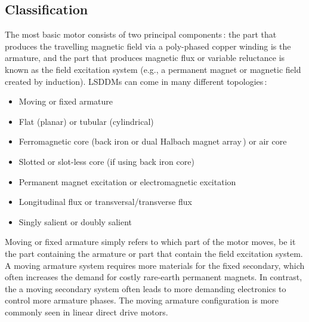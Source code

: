     
    \subsection{Classification}                     \label{Chapter:background/linear synchronous motors for NFJI/classification}
    
        
        The most basic motor consists of two principal components\,\cite{JacekF.GierasZbigniewJ.Piech2017LinearSystems}: the part that produces the travelling magnetic field via a poly-phased copper winding is the armature, and the part that produces magnetic flux or variable reluctance is known as the field excitation system (e.g., a permanent magnet or magnetic field created by induction). \acsp{LSDDM} can come in many different topologies\,\cite{Laithwaite1970}:
        
        
        \begin{itemize}
            \item Moving or fixed armature
            \item Flat (planar) or tubular (cylindrical)
            \item Ferromagnetic core (back iron or dual Halbach magnet array\,\cite{Halbach1980}) or air core
            \item Slotted or slot-less core (if using back iron core)
            \item Permanent magnet excitation or electromagnetic excitation
            \item Longitudinal flux or transversal/transverse flux
            \item Singly salient or doubly salient
        \end{itemize}
        
        
        Moving or fixed armature simply refers to which part of the motor moves, be it the part containing the armature or part that contain the field excitation system. A moving armature system requires more materials for the fixed secondary, which often increases the demand for costly rare-earth permanent magnets. In contrast, the a moving secondary system often leads to more demanding electronics to control more armature phases. The moving armature configuration is more commonly seen in linear direct drive motors. 
        
